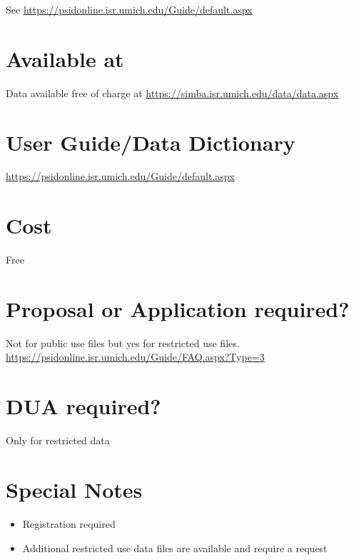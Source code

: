 \documentclass[
]{book}
\providecommand{\tightlist}{%
  \setlength{\itemsep}{0pt}\setlength{\parskip}{0pt}}
\begin{document}
See \url{https://psidonline.isr.umich.edu/Guide/default.aspx}

\hypertarget{available-at-71}{%
\section{Available at}\label{available-at-71}}

Data available free of charge at
\url{https://simba.isr.umich.edu/data/data.aspx}

\hypertarget{user-guidedata-dictionary-71}{%
\section{User Guide/Data Dictionary}\label{user-guidedata-dictionary-71}}

\url{https://psidonline.isr.umich.edu/Guide/default.aspx}

\hypertarget{cost-71}{%
\section{Cost}\label{cost-71}}

Free

\hypertarget{proposal-or-application-required-71}{%
\section{Proposal or Application required?}\label{proposal-or-application-required-71}}

Not for public use files but yes for restricted use files.
\url{https://psidonline.isr.umich.edu/Guide/FAQ.aspx?Type=3}

\hypertarget{dua-required-71}{%
\section{DUA required?}\label{dua-required-71}}

Only for restricted data

\hypertarget{special-notes-71}{%
\section{Special Notes}\label{special-notes-71}}

\begin{itemize}
\tightlist
\item
  Registration required
\item
  Additional restricted use data files are available and require a request
\end{itemize}
\end{document}
